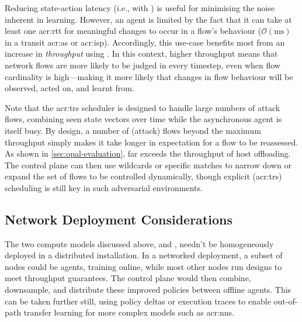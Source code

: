 
Reducing state-action latency (i.e., with \Coopfw) is useful for minimising the noise inherent in learning.
However, an agent is limited by the fact that it can take at least one \gls{acr:rtt} for meaningful changes to occur in a flow's behaviour ($\mathcal{O}{\left(\si{\milli\second}\right)}$ in a transit \gls{acr:as} or \gls{acr:isp}).
Accordingly, this use-case benefits most from an increase in \emph{throughput} using \Indfw{}.
In this context, higher throughput means that network flows are more likely to be judged in every timestep, even when flow cardinality is high---making it more likely that changes in flow behaviour will be observed, acted on, and learnt from.

Note that the \gls{acr:trs} scheduler is designed to handle large numbers of attack flows, combining seen state vectors over time while the asynchronous agent is itself busy.
By design, a number of (attack) flows beyond the maximum throughput simply makes it take longer in expectation for a flow to be reassessed.
As shown in \cref{sec:opal-evaluation}, \approachshort{} far exceeds the throughput of host offloading.
The control plane can then use wildcards or specific matches to narrow down or expand the set of flows to be controlled dynamically, though explicit (\gls{acr:trs}) scheduling is still key in such adversarial environments.


\subsection{Network Deployment Considerations}
The two compute models discussed above, \coopfw{} and \indfw{}, needn't be homogeneously deployed in a distributed installation.
In a networked deployment, a subset of \approachshort{} nodes could be \coopfw{} agents, training online, while most other nodes run \indfw{} designs to meet throughput guarantees.
The control plane would then combine, downsample, and distribute these improved policies between offline agents.
This can be taken further still, using policy deltas or execution traces to enable out-of-path transfer learning for more complex models such as \glspl{acr:nn}.
